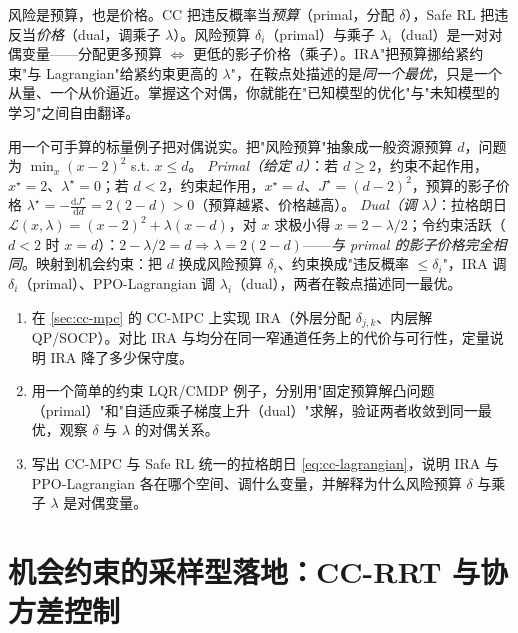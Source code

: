 \begin{insight}
风险是预算，也是价格。CC 把违反概率当\emph{预算}（primal，分配 $\delta$），Safe RL 把违反当\emph{价格}（dual，调乘子 $\lambda$）。风险预算 $\delta_i$（primal）与乘子 $\lambda_i$（dual）是一对对偶变量——分配更多预算 $\Longleftrightarrow$ 更低的影子价格（乘子）。IRA"把预算挪给紧约束"与 Lagrangian"给紧约束更高的 $\lambda$"，在鞍点处描述的是\emph{同一个最优}，只是一个从量、一个从价逼近。掌握这个对偶，你就能在"已知模型的优化"与"未知模型的学习"之间自由翻译。
\end{insight}

\begin{derivation}
用一个可手算的标量例子把对偶说实。把"风险预算"抽象成一般资源预算 $d$，问题为 $\min_x(x-2)^2$ s.t. $x\le d$。
\emph{Primal（给定 $d$）}：若 $d\ge2$，约束不起作用，$x^\star=2$、$\lambda^\star=0$；若 $d<2$，约束起作用，$x^\star=d$、$J^\star=(d-2)^2$，预算的影子价格 $\lambda^\star=-\frac{\mathrm{d}J^\star}{\mathrm{d}d}=2(2-d)>0$（预算越紧、价格越高）。
\emph{Dual（调 $\lambda$）}：拉格朗日 $\mathcal{L}(x,\lambda)=(x-2)^2+\lambda(x-d)$，对 $x$ 求极小得 $x=2-\lambda/2$；令约束活跃（$d<2$ 时 $x=d$）：$2-\lambda/2=d\Rightarrow\lambda=2(2-d)$——\emph{与 primal 的影子价格完全相同}。映射到机会约束：把 $d$ 换成风险预算 $\delta_i$、约束换成"违反概率 $\le\delta_i$"，IRA 调 $\delta_i$（primal）、PPO-Lagrangian 调 $\lambda_i$（dual），两者在鞍点描述同一最优。
\end{derivation}

\begin{practice}
\begin{enumerate}
  \item 在 \cref{sec:cc-mpc} 的 CC-MPC 上实现 IRA（外层分配 $\delta_{j,k}$、内层解 QP/SOCP）。对比 IRA 与均分在同一窄通道任务上的代价与可行性，定量说明 IRA 降了多少保守度。
  \item 用一个简单的约束 LQR/CMDP 例子，分别用"固定预算解凸问题（primal）"和"自适应乘子梯度上升（dual）"求解，验证两者收敛到同一最优，观察 $\delta$ 与 $\lambda$ 的对偶关系。
  \item 写出 CC-MPC 与 Safe RL 统一的拉格朗日 \cref{eq:cc-lagrangian}，说明 IRA 与 PPO-Lagrangian 各在哪个空间、调什么变量，并解释为什么风险预算 $\delta$ 与乘子 $\lambda$ 是对偶变量。
\end{enumerate}
\end{practice}

\section{机会约束的采样型落地：CC-RRT 与协方差控制}
\label{sec:cc-rrt}

